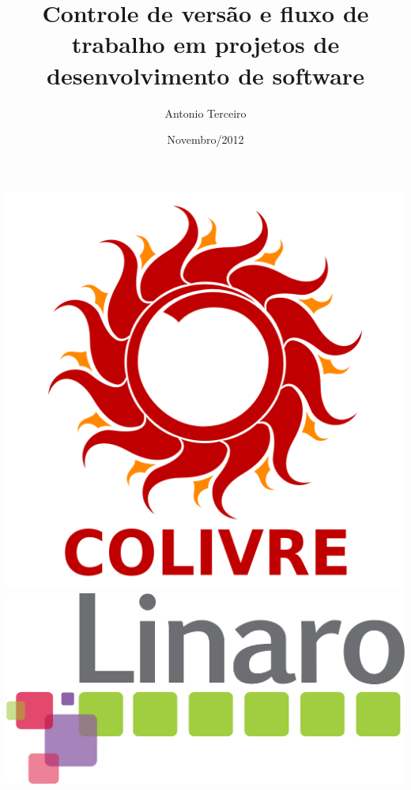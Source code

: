 \documentclass{beamer}
\title[CV e fluxo de trabalho em projetos de software]{Controle de versão e fluxo de trabalho em projetos de
desenvolvimento de software}
\author{Antonio Terceiro}
\date{Novembro/2012}
\begin{document}
\begin{frame}[plain]
  \titlepage
  \begin{center}
    \includegraphics[height=0.3\textheight]{figs/logos/colivre.png}
    \includegraphics[height=0.2\textheight]{figs/logos/linaro_300dpi_rgb.jpg}
  \end{center}
\end{frame}
\end{document}
